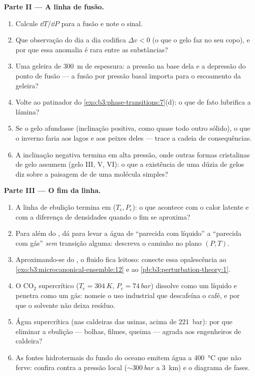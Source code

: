 \begin{problem}
\medskip\noindent\textbf{Parte II --- A linha de fusão.}
\begin{enumerate}[resume]
  \item Calcule $\dd T/\dd P$ para a fusão e note o sinal.
  \item Que observação do dia a dia codifica $\Delta v < 0$ (o que
        o gelo faz no seu copo), e por que essa anomalia é rara
        entre as substâncias?
  \item Uma geleira de \qty{300}{m} de espessura: a pressão na
        base dela e a depressão do ponto de fusão --- a fusão por
        pressão basal importa para o escoamento da geleira?
  \item Volte ao patinador do
        \cref{exo:b3:phase-transitions:7}(d): o que de fato
        lubrifica a lâmina?
  \item Se o gelo afundasse (inclinação positiva, como quase todo outro
        sólido), o que o inverno faria aos lagos e aos peixes deles ---
        trace a cadeia de consequências.
  \item A inclinação negativa termina em alta pressão, onde outras
        formas cristalinas de gelo assumem (gelo III, V, VI): o que a
        existência de uma dúzia de gelos diz sobre a paisagem de  de uma molécula simples?
\end{enumerate}

\medskip\noindent\textbf{Parte III --- O fim da linha.}
\begin{enumerate}[resume]
  \item A linha de ebulição termina em ($T_{\text{c}},
        P_{\text{c}}$): o que acontece com o calor latente e com a
        diferença de densidades quando o fim se aproxima?
  \item Para além do , dá para levar a água de
        ``parecida com líquido'' a ``parecida com gás'' \emph{sem}
        transição alguma: descreva o caminho no plano $(P, T)$.
  \item Aproximando-se do , o fluido fica leitoso:
        conecte essa opalescência ao
        \cref{exo:b3:microcanonical-ensemble:12} e ao
        \cref{pb:b3:perturbation-theory:1}.
  \item O CO$_2$ supercrítico ($T_{\text{c}} = \qty{304}{K}$,
        $P_{\text{c}} = \qty{74}{bar}$) dissolve como um líquido
        e penetra como um gás: nomeie o uso industrial que
        descafeína o café, e por que o solvente não deixa
        resíduo.
  \item Água supercrítica (nas caldeiras das usinas, acima de
        \qty{221}{bar}): por que eliminar a ebulição ---
        bolhas, filmes, queima --- agrada aos engenheiros de caldeira?
  \item As fontes hidrotermais do fundo do oceano emitem água a
        \qty{400}{\celsius} que não ferve: confira contra a
        pressão local ($\sim\qty{300}{bar}$ a \qty{3}{km}) e
        o diagrama de fases.
\end{enumerate}


\end{problem}

